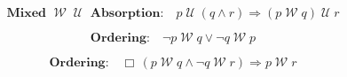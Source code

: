 \documentclass[12pt, fleqn, leqno]{article}
\newcommand{\impl}{\ensuremath{\Rightarrow}}        %
\newcommand{\Until}{\;\mathcal{U}\;}
\newcommand{\Wait}{\;\mathcal{W}\;}
\newcommand{\Always}{\Box\,}
\newcommand{\spacer}{\vspace{-30pt}}
\begin{document}
\begin{equation}\label{E:mix7untilImpAbsR}
\textbf{Mixed $\Wait\Until$ Absorption:}\quad p \Until (q \land r) \impl (p \Wait q) \Until r
\end{equation}

\spacer

\begin{equation}\label{E:waitOrdering}
\textbf{Ordering:}\quad \neg p \Wait q \lor \neg q \Wait p
\end{equation}

\spacer

\begin{equation}\label{E:waitOrderingTwo}
\textbf{Ordering:}\quad \Always (p \Wait q \land \neg q \Wait r) \impl p \Wait r
\end{equation}
\end{document}
